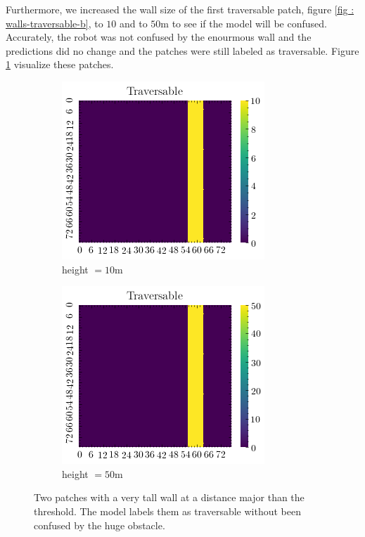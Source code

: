 Furthermore, we increased the wall size of the first traversable patch, figure \ref{fig : walls-traversable-b}, to $10$ and to $50$m to see if the model will be confused. Accurately, the robot was not confused by the enourmous wall and the predictions did no change and the patches were still labeled as traversable. Figure \ref{fig : walls-tall} visualize these patches.
\begin{figure}[htbp]
    \centering
    \begin{subfigure}[b]{0.33\linewidth}
        \includegraphics[width=\linewidth]{../img/5/custom_patches/walls_front/big-1-2d.png}
    \caption{height $=10$m}
    \end{subfigure}   
    \begin{subfigure}[b]{0.33\linewidth}
        \includegraphics[width=\linewidth]{../img/5/custom_patches/walls_front/big-2-2d.png}
        \caption{height $=50$m}
    \end{subfigure}   
\caption{Two patches with a very tall wall at a distance major than the threshold. The model labels them as traversable without been confused by the huge obstacle.}    
\label{fig : walls-tall}
\end{figure}
